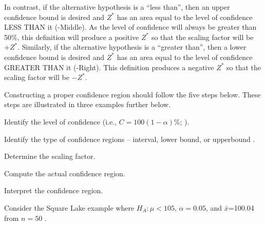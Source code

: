 \documentclass[10pt,openany]{book}\usepackage[]{graphicx}\usepackage[]{color}
\begin{document}
\vspace{-12pt}
In contrast, if the alternative hypothesis is a ``less than'', then an upper confidence bound is desired and $Z^{*}$ has an area equal to the level of confidence LESS THAN it (-Middle). As the level of confidence will always be greater than 50\%, this definition will produce a positive $Z^{*}$ so that the scaling factor will be $+Z^{*}$. Similarly, if the alternative hypothesis is a ``greater than'', then a lower confidence bound is desired and $Z^{*}$ has an area equal to the level of confidence GREATER THAN it (-Right). This definition produces a negative $Z^{*}$ so that the scaling factor will be $-Z^{*}$.


Constructing a proper confidence region should follow the five steps below. These steps are illustrated in three examples further below.

\vspace*{-12pt}
\begin{Enumerate}
  \item Identify the level of confidence (i.e., $C=100(1-\alpha)$\%; ).
  \item Identify the type of confidence regions -- interval, lower bound, or upperbound .
  \item Determine the scaling factor.
  \item Compute the actual confidence region.
  \item Interpret the confidence region.
\end{Enumerate}
\vspace*{-4pt}

Consider the Square Lake example where $H_{A}:\mu < 105$, $\alpha=0.05$, and $\bar{x}$=100.04 from $n=50$ .
\end{document}
